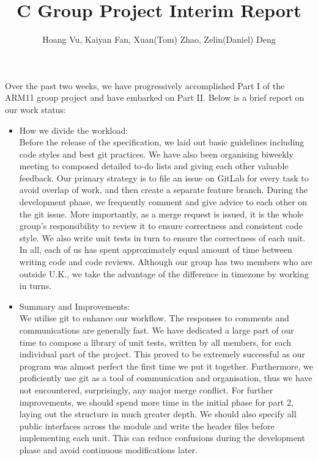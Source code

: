 \documentclass[12pt]{article}
\begin{document}
 
 
\title{C Group Project Interim Report}
\author{Hoang Vu, Kaiyan Fan, Xuan(Tom) Zhao, Zelin(Daniel) Deng}

\maketitle

\noindent Over the past two weeks, we have progressively accomplished Part I of the ARM11 group project and have embarked on Part II. Below is a brief report on our work status:

\begin{itemize} %
  
  \item How we divide the workload:\\
  Before the release of the specification, we laid out basic guidelines including code styles and best git practices. We have also been organising biweekly meeting to composed detailed to-do lists and giving each other valuable feedback. Our primary strategy is to file an issue on GitLab for every task to avoid overlap of work, and then create a separate feature branch. During the development phase, we frequently comment and give advice to each other on the git issue. More importantly, as a merge request is issued, it is the whole group's responsibility to review it to ensure correctness and consistent code style. We also write unit tests in turn to ensure the correctness of each unit. In all, each of us has spent approximately equal amount of time between writing code and code reviews. Although our group has two members who are outside U.K., we take the advantage of the difference in timezone by working in turns.
  
  \item Summary and Improvements:\\
  We utilise git to enhance our workflow. The responses to comments and communications are generally fast. We have dedicated a large part of our time to compose a library of unit tests, written by all members, for each individual part of the project. This proved to be extremely successful as our program was almost perfect the first time we put it together. Furthermore, we proficiently use git as a tool of communication and organisation, thus we have not encountered, surprisingly, any major merge conflict. For further improvements, we should spend more time in the initial phase for part 2, laying out the structure in much greater depth. We should also specify all public interfaces across the module and write the header files before implementing each unit. This can reduce confusions during the development phase and avoid continuous modifications later.
  

\end{itemize}
\end{document}
